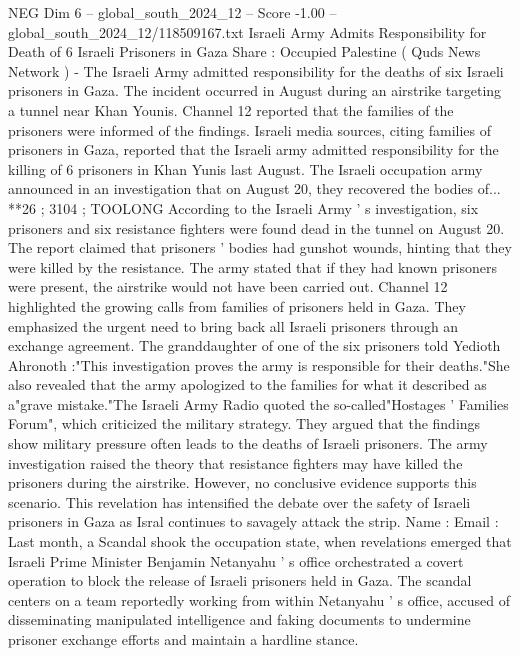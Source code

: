 \begin{textsample}{NEG Dim 6 – global\_south\_2024\_12 – Score -1.00 – global\_south\_2024\_12/118509167.txt}  \label{ex:f6_neg_030}
Israeli Army Admits Responsibility for Death of 6 Israeli Prisoners in Gaza Share : Occupied Palestine ( Quds News Network ) - The Israeli Army admitted responsibility for the deaths of six Israeli prisoners in Gaza.
The incident occurred in August during an airstrike targeting a tunnel near Khan Younis.
Channel 12 reported that the families of the prisoners were informed of the findings.
Israeli media sources, citing families of prisoners in Gaza, reported that the Israeli army admitted responsibility for the killing of 6 prisoners in Khan Yunis last August.
The Israeli occupation army announced in an investigation that on August 20, they recovered the bodies of... **26 ; 3104 ; TOOLONG According to the Israeli Army ' s investigation, six prisoners and six resistance fighters were found dead in the tunnel on August 20.
The report claimed that prisoners ' bodies had gunshot wounds, hinting that they were killed by the resistance.
The army stated that if they had known prisoners were present, the airstrike would not have been carried out.
Channel 12 highlighted the growing calls from families of prisoners held in Gaza.
They emphasized the urgent need to bring back all Israeli prisoners through an exchange agreement.
The granddaughter of one of the six prisoners told Yedioth Ahronoth :"This investigation proves the army is responsible for their deaths."She also revealed that the army apologized to the families for what it described as a"grave mistake."The Israeli Army Radio quoted the so-called"Hostages ' Families Forum", which criticized the military strategy.
They argued that the findings show military pressure often leads to the deaths of Israeli prisoners.
The army investigation raised the theory that resistance fighters may have killed the prisoners during the airstrike.
However, no conclusive evidence supports this scenario.
This revelation has intensified the debate over the safety of Israeli prisoners in Gaza as Isral continues to savagely attack the strip.
Name : Email : Last month, a Scandal shook the occupation state, when revelations emerged that Israeli Prime Minister Benjamin Netanyahu ' s office orchestrated a covert operation to block the release of Israeli prisoners held in Gaza.
The scandal centers on a team reportedly working from within Netanyahu ' s office, accused of disseminating manipulated intelligence and faking documents to undermine prisoner exchange efforts and maintain a hardline stance.

\end{textsample}
